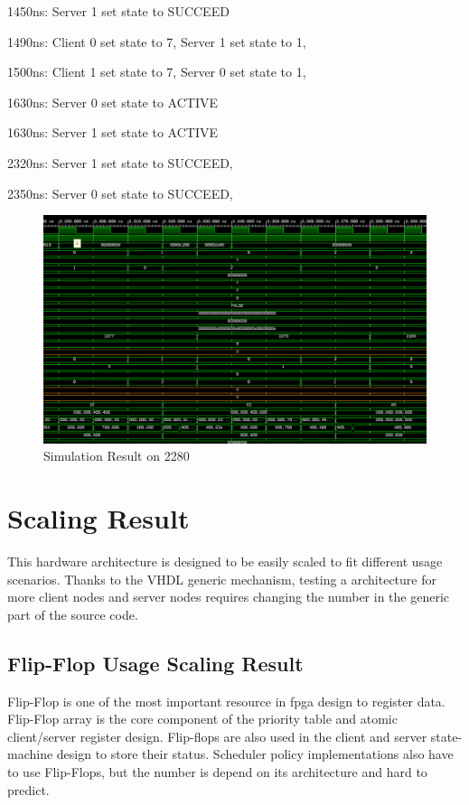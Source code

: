 1450ns:   Server 1 set state to SUCCEED

1490ns:   Client 0 set state to 7, Server 1 set state to 1, 

1500ns:   Client 1 set state to 7, Server 0 set state to 1, 

1630ns:   Server 0 set state to ACTIVE 

1630ns:   Server 1 set state to ACTIVE 

2320ns:   Server 1 set state to SUCCEED, 

2350ns:   Server 0 set state to SUCCEED, 

\begin{figure}[htb]
	\centering
	\includegraphics[width=.7\linewidth]{figures/new-sim/sim-2280.png}
	\caption{Simulation Result on 2280}
	\label{fig:sim2280}
\end{figure}


\section{Scaling Result}

This hardware architecture is designed to be easily scaled to fit different usage scenarios. Thanks to the VHDL generic mechanism, testing a architecture for more client nodes and server nodes requires changing the number in the generic part of the source code. 


\subsection{Flip-Flop Usage Scaling Result}

Flip-Flop is one of the most important resource in \gls{fpga} design to register data. Flip-Flop array is the core component of the priority table and atomic client/server register design. Flip-flops are also used in the client and server state-machine design to store their status. Scheduler policy implementations also have to use Flip-Flops, but the number is depend on its architecture and hard to predict. 

